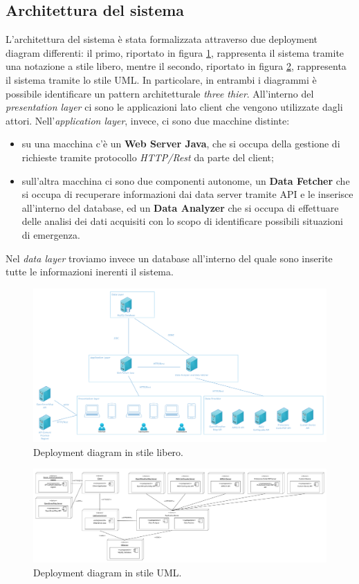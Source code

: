 \clearpage
\subsection{Architettura del sistema}
L'architettura del sistema è stata formalizzata attraverso due deployment diagram differenti: il primo, riportato in figura \ref{fig:DeplymnetDiagramNonFormale}, rappresenta il sistema tramite una notazione a stile libero, mentre il secondo, riportato in figura \ref{fig:DeplymnetDiagramFormale}, rappresenta il sistema tramite lo stile UML. In particolare, in entrambi i diagrammi è possibile identificare un pattern architetturale \textit{three thier}. All'interno del \textit{presentation layer} ci sono le applicazioni lato client che vengono utilizzate dagli attori. Nell'\textit{application layer}, invece, ci sono due macchine distinte:

\begin{itemize}
	\item su una macchina c'è un \textbf{Web Server Java}, che si occupa della gestione di richieste tramite protocollo \textit{HTTP/Rest} da parte del client;
	\item sull'altra macchina ci sono due componenti autonome, un \textbf{Data Fetcher} che si occupa di recuperare informazioni dai data server tramite API e le inserisce all'interno del database, ed un \textbf{Data Analyzer} che si occupa di effettuare delle analisi dei dati acquisiti con lo scopo di identificare possibili situazioni di emergenza.
\end{itemize}

Nel \textit{data layer} troviamo invece un database all'interno del quale sono inserite tutte le informazioni inerenti il sistema.

\begin{figure}
	\centering
	\includegraphics[width=0.9\linewidth]{OtherFiles/DeploymentDiagramNonFormale}
	\caption{Deployment diagram in stile libero.}
	\label{fig:DeplymnetDiagramNonFormale}
\end{figure}

\begin{figure}
	\centering
	\includegraphics[width=0.9\linewidth]{OtherFiles/DeplymentDiagramFormale}
	\caption{Deployment diagram in stile UML.}
	\label{fig:DeplymnetDiagramFormale}
\end{figure}
